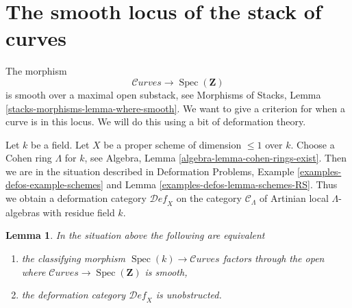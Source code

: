 \documentclass{stacks-project}
\theoremstyle{plain}
\newtheorem{lemma}[subsection]{Lemma}
\theoremstyle{definition}
\theoremstyle{remark}
\numberwithin{equation}{subsection}
\def\Spec{\mathop{\mathrm{Spec}}}
\def\Curvesstack{\mathcal{C}\!\mathit{urves}}
\def\Deformationcategory{\mathcal{D}\!\mathit{ef}}
\begin{document}
\section{The smooth locus of the stack of curves}
\label{section-smooth}

\noindent
The morphism
$$
\Curvesstack \longrightarrow \Spec(\mathbf{Z})
$$
is smooth over a maximal open substack, see
Morphisms of Stacks, Lemma \ref{stacks-morphisms-lemma-where-smooth}.
We want to give a criterion for when a curve is in this locus.
We will do this using a bit of deformation theory.

\medskip\noindent
Let $k$ be a field. Let $X$ be a proper scheme of dimension $\leq 1$ over $k$.
Choose a Cohen ring $\Lambda$ for $k$, see
Algebra, Lemma \ref{algebra-lemma-cohen-rings-exist}.
Then we are in the situation described in
Deformation Problems, Example \ref{examples-defos-example-schemes} and
Lemma \ref{examples-defos-lemma-schemes-RS}.
Thus we obtain a deformation category $\Deformationcategory_X$
on the category $\mathcal{C}_\Lambda$ of Artinian local
$\Lambda$-algebras with residue field $k$.

\begin{lemma}
\label{lemma-in-smooth-locus}
In the situation above the following are equivalent
\begin{enumerate}
\item the classifying morphism $\Spec(k) \to \Curvesstack$ factors
through the open where $\Curvesstack \to \Spec(\mathbf{Z})$ is smooth,
\item the deformation category $\Deformationcategory_X$ is unobstructed.
\end{enumerate}
\end{lemma}
\end{document}
